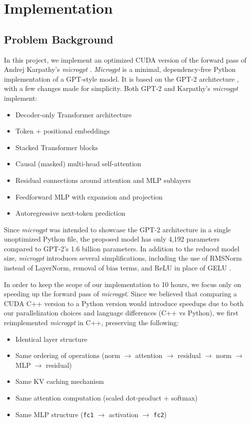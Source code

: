 
\section{Implementation}

\subsection*{Problem Background}

In this project, we implement an optimized CUDA version of the forward pass of Andrej Karpathy's \textit{microgpt} \cite{karpathyMicrogpt2026}. \textit{Microgpt} is a minimal, dependency-free Python implementation of a GPT-style model. It is based on the GPT-2 architecture \cite{radfordLanguageModelsAre2019}, with a few changes made for simplicity. Both GPT-2 and Karpathy's \textit{microgpt} implement:
\begin{itemize}[noitemsep, topsep=0pt]
  \item Decoder-only Transformer architecture
  \item Token + positional embeddings
  \item Stacked Transformer blocks
  \item Causal (masked) multi-head self-attention
  \item Residual connections around attention and MLP sublayers
  \item Feedforward MLP with expansion and projection
  \item Autoregressive next-token prediction
\end{itemize}
Since \textit{microgpt} was intended to showcase the GPT-2 architecture in a single unoptimized Python file, the proposed model has only 4,192 parameters compared to GPT-2's 1.6 billion parameters. In addition to the reduced model size, \textit{microgpt} introduces several simplifications, including the use of RMSNorm instead of LayerNorm, removal of bias terms, and ReLU in place of GELU \cite{karpathyMicrogpt2026}. 

\noindent In order to keep the scope of our implementation to 10 hours, we focus only on speeding up the forward pass of \textit{microgpt}. Since we believed that comparing a CUDA C++ version to a Python version would introduce speedups due to both our parallelization choices and language differences (C++ vs Python), we first reimplemented \textit{microgpt} in C++, preserving the following:
\begin{itemize}[noitemsep, topsep=0pt]  \item Identical layer structure
  \item Same ordering of operations (norm $\rightarrow$ attention $\rightarrow$ residual $\rightarrow$ norm $\rightarrow$ MLP $\rightarrow$ residual)
  \item Same KV caching mechanism
  \item Same attention computation (scaled dot-product + softmax)
  \item Same MLP structure (\texttt{fc1} $\rightarrow$ activation $\rightarrow$ \texttt{fc2})
\end{itemize}

